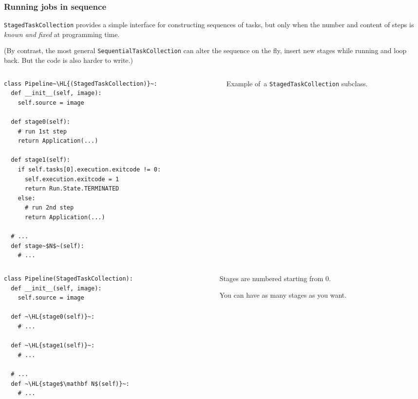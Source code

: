 \documentclass[english,serif,mathserif,xcolor=pdftex,dvipsnames,table]{beamer}
\begin{document}
\begin{frame}[fragile]
  \frametitle{Running jobs in sequence}

  \texttt{StagedTaskCollection} provides a simple interface for
  constructing sequences of tasks, but only when the number and
  content of steps is \emph{known and fixed} at programming time.

  \+
  (By contrast, the most general \texttt{SequentialTaskCollection}
  can alter the sequence on the fly, insert new stages while running
  and loop back. But the code is also harder to write.)
\end{frame}


\begin{frame}[fragile]
  \begin{columns}[t]
    \begin{column}{0.6\textwidth}
      \begin{lstlisting}
class Pipeline~\HL{(StagedTaskCollection)}~:
  def __init__(self, image):
    self.source = image

  def stage0(self):
    # run 1st step
    return Application(...)

  def stage1(self):
    if self.tasks[0].execution.exitcode != 0:
      self.execution.exitcode = 1
      return Run.State.TERMINATED
    else:
      # run 2nd step
      return Application(...)

  # ...
  def stage~$N$~(self):
    # ...
      \end{lstlisting}
    \end{column}
    \begin{column}{0.4\textwidth}
      \raggedleft

      \+\+
      Example of~a \texttt{StagedTaskCollection}
      subclass.
    \end{column}
  \end{columns}
\end{frame}


\begin{frame}[fragile]
  \begin{columns}[c]
    \begin{column}{0.6\textwidth}
      \begin{lstlisting}
class Pipeline(StagedTaskCollection):
  def __init__(self, image):
    self.source = image

  def ~\HL{stage0(self)}~:
    # ...

  def ~\HL{stage1(self)}~:
    # ...

  # ...
  def ~\HL{stage$\mathbf N$(self)}~:
    # ...
      \end{lstlisting}
    \end{column}
    \begin{column}{0.4\textwidth}
      \raggedleft

      Stages are numbered starting from $0$.

      \+
      You can have as many stages as you want.
    \end{column}
  \end{columns}
\end{frame}
\end{document}
